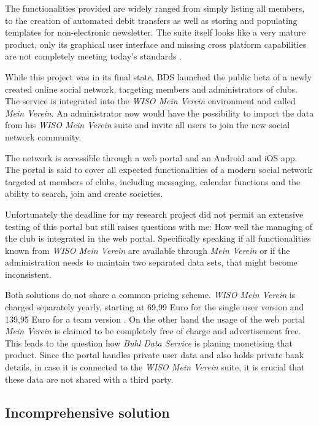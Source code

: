 The functionalities provided are widely ranged from simply listing all members, to the creation of automated debit transfers as well as storing and populating templates for non-electronic newsletter. The suite itself looks like a very mature product, only its graphical user interface and missing cross platform capabilities are not completely meeting today's standards \cite{Buhl:2015ab}. 

While this project was in its final state, \gls{BDS} launched the public beta of a newly created online social network, targeting members and administrators of clubs. The service is integrated into the \emph{WISO Mein Verein} environment and called \emph{Mein Verein}. An administrator now would have the possibility to import the data from his \emph{WISO Mein Verein} suite and invite all users to join the new social network community. 

The network is accessible through a web portal and an Android and iOS app. The portal is said to cover all expected functionalities of a modern social network targeted at members of clubs, including messaging, calendar functions and the ability to search, join and create societies. 

Unfortunately the deadline for my research project did not permit an extensive testing of this portal but still raises questions with me: How well the managing of the club is integrated in the web portal. Specifically speaking if all functionalities known from \emph{WISO Mein Verein} are available through \emph{Mein Verein} or if the administration needs to maintain two separated data sets, that might become inconsistent. 

Both solutions do not share a common pricing scheme. \emph{WISO Mein Verein} is charged separately yearly, starting at 69,99 Euro for the single user version and 139,95 Euro for a team version \cite{Buhl:2015ab}. On the other hand the usage of the web portal \emph{Mein Verein} is claimed to be completely free of charge and advertisement free. This leads to the question how \emph{Buhl Data Service} is planing monetising that product. Since the portal handles private user data and also holds private bank details, in case it is connected to the \emph{WISO Mein Verein} suite, it is crucial that these data are not shared with a third party.

\subsection{Incomprehensive solution}

